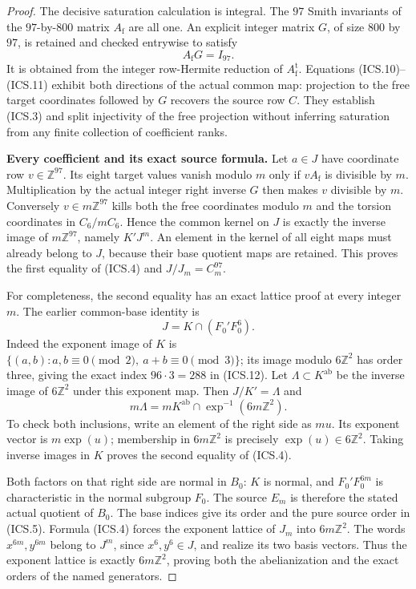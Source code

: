 \begin{proof}
The decisive saturation calculation is integral. The $97$
Smith invariants of the $97$-by-$800$ matrix $A_{\mathrm f}$ are all
one. An explicit integer matrix $G$, of size $800$ by $97$,
is retained and checked entrywise to satisfy
\[
                             A_{\mathrm f}G=I_{97}.
                                                        \tag{ICS.11}
\]
It is obtained from the integer row-Hermite reduction of
$A_{\mathrm f}^{\mathrm t}$. Equations (ICS.10)--(ICS.11) exhibit
both directions of the actual common map: projection to
the free target coordinates followed by $G$ recovers the
source row $C$. They establish (ICS.3) and split
injectivity of the free projection without inferring
saturation from any finite collection of coefficient ranks.

\par\medskip\noindent\textbf{Every coefficient and its exact source formula.}\quad
Let $a\in J$ have coordinate row $v\in\mathbb Z^{97}$.
Its eight target values vanish modulo $m$ only if
$vA_{\mathrm f}$ is divisible by $m$. Multiplication by the actual
integer right inverse $G$ then makes $v$ divisible by $m$.
Conversely $v\in m\mathbb Z^{97}$ kills both the free
coordinates modulo $m$ and the torsion coordinates in
$C_6/mC_6$. Hence the common kernel on $J$ is exactly
the inverse image of $m\mathbb Z^{97}$, namely $K'J^m$.
An element in the kernel of all eight maps must already
belong to $J$, because their base quotient maps are retained.
This proves the first equality of (ICS.4) and
$J/J_m=C_m^{97}$.

For completeness, the second equality has an exact lattice
proof at every integer $m$. The earlier common-base identity is
\[
 J=K\cap(F_0'F_0^6).
                                                        \tag{ICS.12}
\]
Indeed the exponent image of $K$ is
$\{(a,b):a,b\equiv0\pmod2,\ a+b\equiv0\pmod3\}$;
its image modulo $6\mathbb Z^2$ has order three, giving
the exact index $96\cdot3=288$ in (ICS.12).
Let $\Lambda\subset K^{\mathrm{ab}}$ be the inverse image
of $6\mathbb Z^2$ under this exponent map. Then
$J/K'=\Lambda$ and
\[
 m\Lambda
    =mK^{\mathrm{ab}}\cap
        \operatorname{exp}^{-1}(6m\mathbb Z^2).
                                                        \tag{ICS.13}
\]
To check both inclusions, write an element of the right side
as $mu$. Its exponent vector is $m\operatorname{exp}(u)$;
membership in $6m\mathbb Z^2$ is precisely
$\operatorname{exp}(u)\in6\mathbb Z^2$.
Taking inverse images in $K$ proves the second equality
of (ICS.4).

Both factors on that right side are normal in $B_0$:
$K$ is normal, and $F_0'F_0^{6m}$ is characteristic in
the normal subgroup $F_0$. The source $E_m$ is therefore
the stated actual quotient of $B_0$. The base indices give
its order and the pure source order in (ICS.5).
Formula (ICS.4) forces the exponent lattice of $J_m$ into
$6m\mathbb Z^2$. The words $x^{6m},y^{6m}$ belong to
$J^m$, since $x^6,y^6\in J$, and realize its two basis
vectors. Thus the exponent lattice is exactly
$6m\mathbb Z^2$, proving both the abelianization and the
exact orders of the named generators.


\end{proof}
